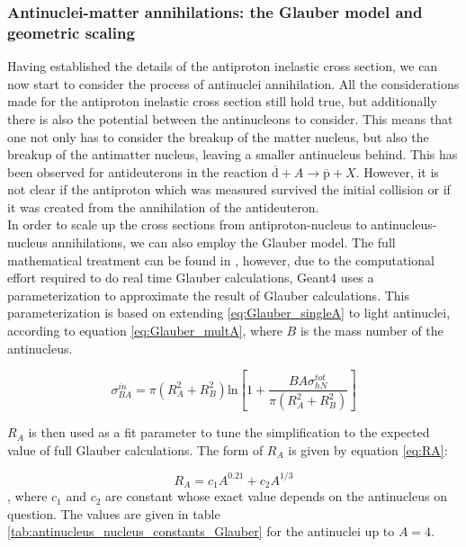 \subsubsection{Antinuclei-matter annihilations: the Glauber model and geometric scaling}\label{sec:IntroGlauber}
Having established the details of the antiproton inelastic cross section, we can now start to consider the process of antinuclei annihilation. All the considerations made for the antiproton inelastic cross section still hold true, but additionally there is also the potential between the antinucleons to consider. This means that one not only has to consider the breakup of the matter nucleus, but also the breakup of the antimatter nucleus, leaving a smaller antinucleus behind. This has been observed for antideuterons in the reaction $\overline{\mathrm{d}} + A \rightarrow \overline{\mathrm{p}}+X$\cite{Denisov:1971im, Binon:1970yu}. However, it is not clear if the antiproton which was measured survived the initial collision or if it was created from the annihilation of the antideuteron.\\

In order to scale up the cross sections from antiproton-nucleus to antinucleus-nucleus annihilations, we can also employ the Glauber model. The full mathematical treatment can be found in \cite{Uzhinsky:2011zz}, however, due to the computational effort required to do real time Glauber calculations, Geant4 uses a parameterization to approximate the result of Glauber calculations. This parameterization is based on extending \ref{eq:Glauber_singleA} to light antinuclei, according to equation \ref{eq:Glauber_multA}, where $B$ is the mass number of the antinucleus. 

\begin{equation}\label{eq:Glauber_multA}
     \sigma_{BA}^{in} = \pi(R_A^2+R_B^2) \mathrm{ln}\left[ 1+\frac{BA\sigma_{hN}^{tot}}{\pi ( R_A^2 + R_B^2)}\right]
\end{equation}

$R_A$ is then used as a fit parameter to tune the simplification to the expected value of full Glauber calculations. The form of $R_A$ is given by equation \ref{eq:RA}:

\begin{equation}\label{eq:RA}
    R_A = c_1 A^{0.21}+c_2 A^{1/3}
\end{equation}
, where $c_1$ and $c_2$ are constant whose exact value depends on the antinucleus on question. The values are given in table \ref{tab:antinucleus_nucleus_constants_Glauber} for the antinuclei up to $A=4$. 

